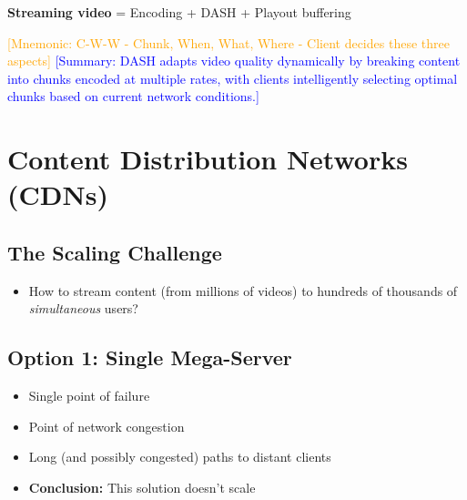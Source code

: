 \documentclass[12pt]{article}
\begin{document}
\textbf{Streaming video} = Encoding + DASH + Playout buffering

\textcolor{orange}{[Mnemonic: C-W-W - Chunk, When, What, Where - Client decides these three aspects]}
\textcolor{blue}{[Summary: DASH adapts video quality dynamically by breaking content into chunks encoded at multiple rates, with clients intelligently selecting optimal chunks based on current network conditions.]}

\section{Content Distribution Networks (CDNs)}

\subsection{The Scaling Challenge}
\begin{itemize}
    \item How to stream content (from millions of videos) to hundreds of thousands of \textit{simultaneous} users?
\end{itemize}

\subsection{Option 1: Single Mega-Server}
\begin{itemize}
    \item Single point of failure
    \item Point of network congestion
    \item Long (and possibly congested) paths to distant clients
    \item \textbf{Conclusion:} This solution doesn't scale
\end{itemize}
\end{document}
